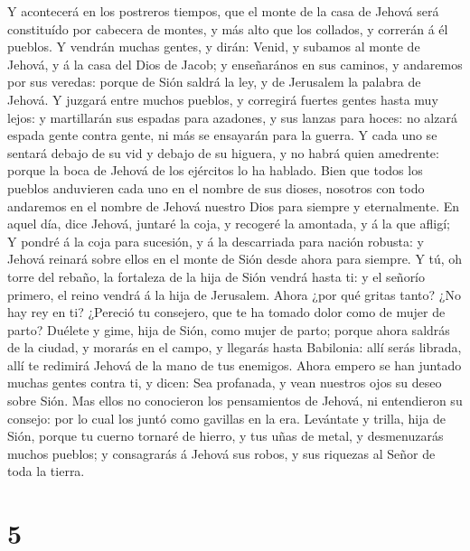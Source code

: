  Y acontecerá en los postreros tiempos, que el monte de la
casa de Jehová será constituído por cabecera de montes, y más alto que
los collados, y correrán á él pueblos.  Y vendrán muchas
gentes, y dirán: Venid, y subamos al monte de Jehová, y á la casa del
Dios de Jacob; y enseñarános en sus caminos, y andaremos por sus
veredas: porque de Sión saldrá la ley, y de Jerusalem la palabra de
Jehová.  Y juzgará entre muchos pueblos, y corregirá
fuertes gentes hasta muy lejos: y martillarán sus espadas para azadones,
y sus lanzas para hoces: no alzará espada gente contra gente, ni más se
ensayarán para la guerra.  Y cada uno se sentará debajo de
su vid y debajo de su higuera, y no habrá quien amedrente: porque la
boca de Jehová de los ejércitos lo ha hablado.  Bien que
todos los pueblos anduvieren cada uno en el nombre de sus dioses,
nosotros con todo andaremos en el nombre de Jehová nuestro Dios para
siempre y eternalmente.  En aquel día, dice Jehová,
juntaré la coja, y recogeré la amontada, y á la que afligí;
 Y pondré á la coja para sucesión, y á la descarriada para
nación robusta: y Jehová reinará sobre ellos en el monte de Sión desde
ahora para siempre.  Y tú, oh torre del rebaño, la
fortaleza de la hija de Sión vendrá hasta ti: y el señorío primero, el
reino vendrá á la hija de Jerusalem.  Ahora ¿por qué
gritas tanto? ¿No hay rey en ti? ¿Pereció tu consejero, que te ha tomado
dolor como de mujer de parto?  Duélete y gime, hija de
Sión, como mujer de parto; porque ahora saldrás de la ciudad, y morarás
en el campo, y llegarás hasta Babilonia: allí serás librada, allí te
redimirá Jehová de la mano de tus enemigos.  Ahora empero
se han juntado muchas gentes contra ti, y dicen: Sea profanada, y vean
nuestros ojos su deseo sobre Sión.  Mas ellos no
conocieron los pensamientos de Jehová, ni entendieron su consejo: por lo
cual los juntó como gavillas en la era.  Levántate y
trilla, hija de Sión, porque tu cuerno tornaré de hierro, y tus uñas de
metal, y desmenuzarás muchos pueblos; y consagrarás á Jehová sus robos,
y sus riquezas al Señor de toda la tierra.

\hypertarget{section-4}{%
\section{5}\label{section-4}}


